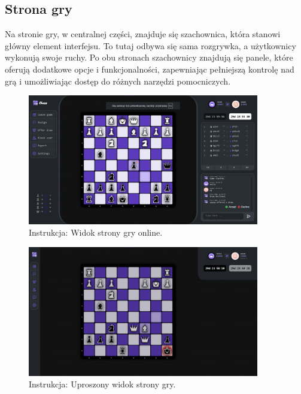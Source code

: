 \documentclass[twoside]{projektInzynierskiMS1}
\begin{document}
\newpage

\subsection{Strona gry}

\noindent
Na stronie gry, w centralnej części, znajduje się szachownica, która stanowi główny element interfejsu. To tutaj odbywa się sama rozgrywka, a użytkownicy wykonują swoje ruchy. Po obu stronach szachownicy znajdują się panele, które oferują dodatkowe opcje i funkcjonalności, zapewniając pełniejszą kontrolę nad grą i umożliwiając dostęp do różnych narzędzi pomocniczych.

\vspace{1cm}
\begin{figure}[h!]
    \centering
    \includegraphics[width=0.9\textwidth]{images/ins_webgame.png}
    \caption{Instrukcja: Widok strony gry online.}
\end{figure}

\begin{figure}[h!]
    \centering
    \includegraphics[width=0.9\textwidth]{images/ins_simpgame.png}
    \caption{Instrukcja: Uproszony widok strony gry.}
\end{figure}
\end{document}
